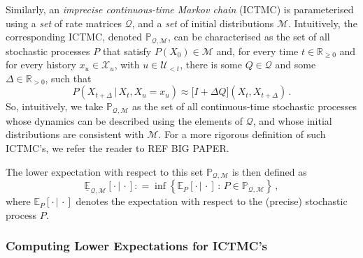 \documentclass[twoside,11pt]{article}
\newcommand{\reals}{\mathbb{R}}
\newcommand{\realspos}{\reals_{>0}}
\newcommand{\realsnonneg}{\reals_{\geq 0}}
\newcommand{\states}{\mathcal{X}}
\newcommand{\rateset}{\mathcal{Q}}
\newcommand{\coloneqq}{:\!=}
\begin{document}
Similarly, an \emph{imprecise continuous-time Markov chain} (ICTMC) is parameterised using a \emph{set} of rate matrices $\rateset$, and a \emph{set} of initial distributions $\mathcal{M}$. Intuitively, the corresponding ICTMC, denoted $\mathbb{P}_{\rateset,\mathcal{M}}$, can be characterised as the set of all stochastic processes $P$ that satisfy $P(X_0)\in\mathcal{M}$ and, for every time $t\in\realsnonneg$ and for every history $x_u\in\states_u$, with $u\in\mathcal{U}_{<t}$, there is some $Q\in\rateset$ and some $\Delta\in\realspos$, such that
\begin{equation*}
P(X_{t+\Delta}\,\vert\,X_t,X_u=x_u) \approx \bigl[I + \Delta Q\bigr](X_t, X_{t+\Delta})\,.
\end{equation*}
So, intuitively, we take $\mathbb{P}_{\rateset,\mathcal{M}}$ as the set of all continuous-time stochastic processes whose dynamics can be described using the elements of $\rateset$, and whose initial distributions are consistent with $\mathcal{M}$. For a more rigorous definition of such ICTMC's, we refer the reader to REF BIG PAPER.

The lower expectation with respect to this set $\mathbb{P}_{\rateset,\mathcal{M}}$ is then defined as
\begin{equation*}
\underline{\mathbb{E}}_{\rateset,\mathcal{M}}[\cdot\,\vert\,\cdot] \coloneqq \inf\left\{ \mathbb{E}_P[\cdot\,\vert\,\cdot]\,:\, P\in\mathbb{P}_{\rateset,\mathcal{M}} \right\}\,,
\end{equation*}
where $\mathbb{E}_P[\cdot\,\vert\,\cdot]$ denotes the expectation with respect to the (precise) stochastic process $P$.

\subsubsection{Computing Lower Expectations for ICTMC's}
\end{document}
